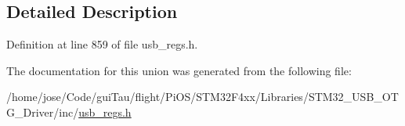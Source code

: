 \subsection{Detailed Description}


Definition at line 859 of file usb\-\_\-regs.\-h.



The documentation for this union was generated from the following file\-:\begin{DoxyCompactItemize}
\item 
/home/jose/\-Code/gui\-Tau/flight/\-Pi\-O\-S/\-S\-T\-M32\-F4xx/\-Libraries/\-S\-T\-M32\-\_\-\-U\-S\-B\-\_\-\-O\-T\-G\-\_\-\-Driver/inc/\hyperlink{_s_t_m32_f4xx_2_libraries_2_s_t_m32___u_s_b___o_t_g___driver_2inc_2usb__regs_8h}{usb\-\_\-regs.\-h}\end{DoxyCompactItemize}
